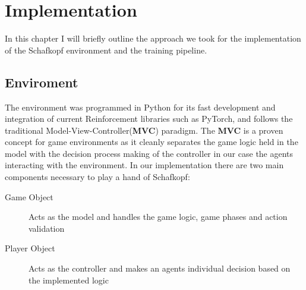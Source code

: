 \chapter{Implementation}
In this chapter I will briefly outline the approach we took for the implementation of the Schafkopf environment and
the training pipeline.


\section{Enviroment}
The environment was programmed in Python for its fast development and integration of current Reinforcement libraries
such as PyTorch, and follows the traditional Model-View-Controller(\textbf{MVC}) paradigm.
The \textbf{MVC} is a proven concept for game environments as it cleanly separates the game logic held in the model
with the decision process making of the controller in our case the agents interacting with the environment.
In our implementation there are two main components necessary to play a hand of Schafkopf:
\begin{description}
    \item[Game Object] Acts as the model and handles the game logic, game phases and action validation
    \item[Player Object] Acts as the controller and makes an agents individual decision based on the implemented logic
\end{description}


